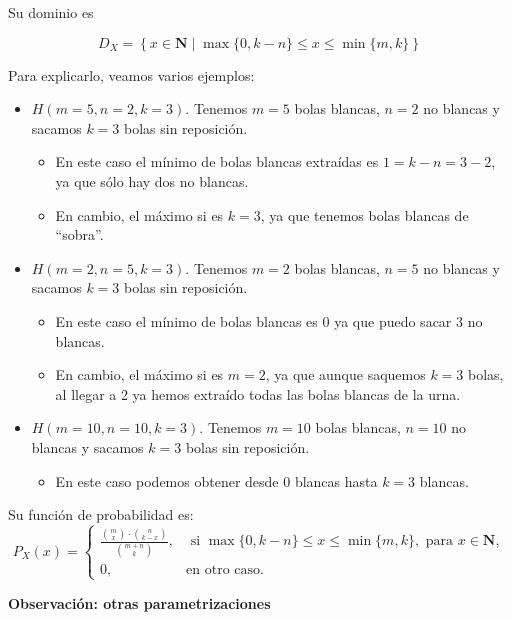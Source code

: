 \documentclass[]{book}
\providecommand{\tightlist}{%
  \setlength{\itemsep}{0pt}\setlength{\parskip}{0pt}}
\begin{document}
Su dominio es

\[D_X=\left\{x\in\mathbf{N}\mid \max\{0,k-n\}\leq  x \leq \min\{m,k\}\right\}\]

Para explicarlo, veamos varios ejemplos:

\begin{itemize}
\tightlist
\item
  \(H(m=5,n=2,k=3)\). Tenemos \(m=5\) bolas blancas, \(n=2\) no blancas y sacamos \(k=3\) bolas sin reposición.

  \begin{itemize}
  \tightlist
  \item
    En este caso el mínimo de bolas blancas extraídas es \(1=k-n=3-2\), ya que sólo hay dos no blancas.
  \item
    En cambio, el máximo si es \(k=3\), ya que tenemos bolas blancas de ``sobra''.
  \end{itemize}
\item
  \(H(m=2,n=5,k=3)\). Tenemos \(m=2\) bolas blancas, \(n=5\) no blancas y sacamos \(k=3\) bolas sin reposición.

  \begin{itemize}
  \tightlist
  \item
    En este caso el mínimo de bolas blancas es \(0\) ya que puedo sacar 3 no blancas.
  \item
    En cambio, el máximo si es \(m=2\), ya que aunque saquemos \(k=3\) bolas, al llegar a 2 ya hemos extraído todas las bolas blancas de la urna.
  \end{itemize}
\item
  \(H(m=10,n=10,k=3)\). Tenemos \(m=10\) bolas blancas, \(n=10\) no blancas y sacamos \(k=3\) bolas sin reposición.

  \begin{itemize}
  \tightlist
  \item
    En este caso podemos obtener desde \(0\) blancas hasta \(k=3\) blancas.
  \end{itemize}
\end{itemize}

Su función de probabilidad es:
\[
P_{X}(x)=\left\{
\begin{array}{ll}
\frac{\binom{m}{x}\cdot \binom{n}{k-x}}{\binom{m+n}{k}}, & \mbox{ si }
\max\{0,k-n\}\leq x \leq \min\{m,k\}, \mbox { para  } x\in \mathbf{N},\\
0,  & \mbox{en otro caso.}\end{array}\right.
\]

\textbf{Observación: otras parametrizaciones}
\end{document}
